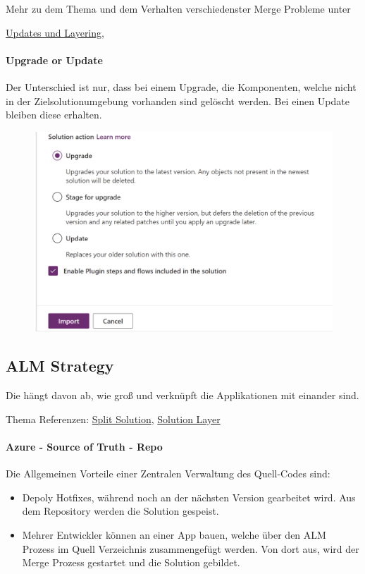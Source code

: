 Mehr zu dem Thema und dem Verhalten verschiedenster Merge Probleme unter 

\href{https://benediktbergmann.eu/2022/01/18/dataverse-solutions-explained/}{Updates und Layering}, \href{}{} 

\paragraph{Upgrade or Update}
Der Unterschied ist nur, dass bei einem Upgrade, die Komponenten, welche nicht in der Zielsolutionumgebung vorhanden sind gelöscht werden. Bei einen Update bleiben diese erhalten.
\begin{figure}[H]
	\centering
	\includegraphics[scale = 0.3]{attachment/chapter_13/Scc053} 
\end{figure}


\subsection{ALM Strategy}
Die hängt davon ab, wie groß und verknüpft die Applikationen mit einander sind.

Thema Referenzen: \href{https://benediktbergmann.eu/2022/01/18/dataverse-solutions-explained/}{Split Solution}, \href{https://docs.microsoft.com/en-us/powerapps/maker/data-platform/solution-layers}{Solution Layer}


\paragraph{Azure - Source of Truth - Repo}
Die Allgemeinen Vorteile einer Zentralen Verwaltung des Quell-Codes sind:
\begin{itemize}
	\item Depoly Hotfixes, während noch an der nächsten Version gearbeitet wird. Aus dem Repository werden die Solution gespeist.
	\item Mehrer Entwickler können an einer App bauen, welche über den \gls{ALM} Prozess im Quell Verzeichnis zusammengefügt werden. Von dort aus, wird der Merge Prozess gestartet und die Solution gebildet.
\end{itemize}

